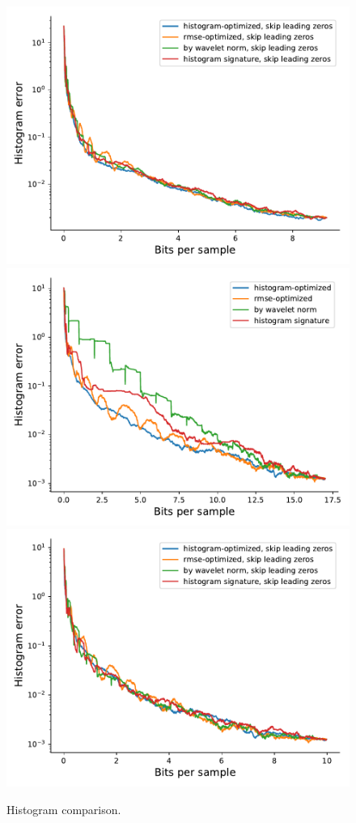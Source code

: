 \begin{figure}
	{\includegraphics[width=0.48\linewidth]{img/histogram/skip-leading-zeros/miranda-diffusivity-histogram.pdf}}
	{\includegraphics[width=0.48\linewidth]{img/histogram/turbulence-histogram.pdf}}
	{\includegraphics[width=0.48\linewidth]{img/histogram/skip-leading-zeros/turbulence-histogram.pdf}}
	\caption{Histogram comparison.}
	\label{fig:histogram-comparison}
\end{figure}

